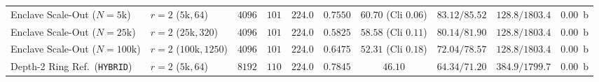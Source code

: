 \documentclass[10pt,journal,compsoc]{IEEEtran}
\begin{document}
\begin{table}[!t]
\begin{adjustbox}{max width=\textwidth}
\begin{tabular}{@{}llcccccccc@{}}
\midrule
Enclave Scale-Out ($N\!=\!5\text{k}$) & $r=2$ ($5\text{k}, 64$) & $4096$ & $101$ & $224.0$ & $0.7550$ & $\mathbf{60.70}$ (Cli $0.06$) & $83.12 / 85.52$ & $128.8 / 1803.4$ & $0.00$~b \\
Enclave Scale-Out ($N\!=\!25\text{k}$) & $r=2$ ($25\text{k}, 320$) & $4096$ & $101$ & $224.0$ & $0.5825$ & $\mathbf{58.58}$ (Cli $0.11$) & $80.14 / 81.90$ & $128.8 / 1803.4$ & $0.00$~b \\
Enclave Scale-Out ($N\!=\!100\text{k}$) & $r=2$ ($100\text{k}, 1250$) & $4096$ & $101$ & $224.0$ & $0.6475$ & $\mathbf{52.31}$ (Cli $0.18$) & $72.04 / 78.57$ & $128.8 / 1803.4$ & $0.00$~b \\
Depth-2 Ring Ref.\ (\texttt{HYBRID}) & $r=2$ ($5\text{k}, 64$) & $8192$ & $110$ & $224.0$ & $0.7845$ & $46.10$ & $64.34 / 71.20$ & $384.9 / 1799.7$ & $0.00$~b \\
\bottomrule
\end{tabular}
\end{adjustbox}
\end{table}
\end{document}
